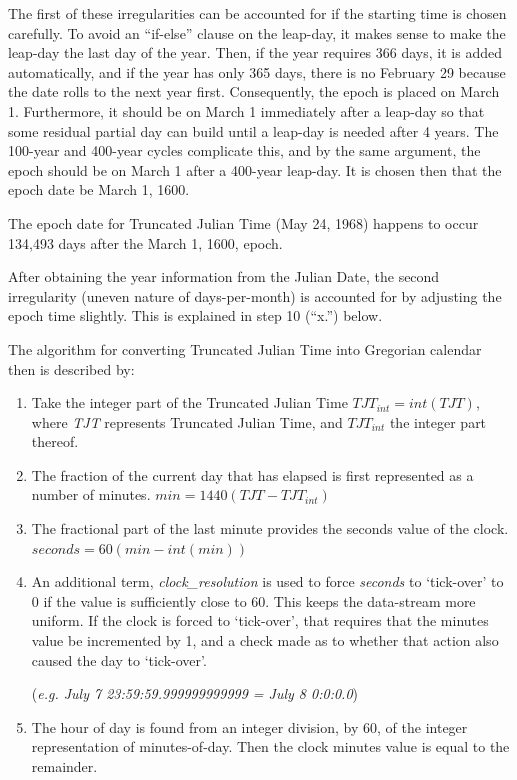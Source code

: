 {\begin{enumerate}
{\begin{enumerate}
The first of these irregularities can be accounted for if the starting
time is chosen carefully.  To avoid an
{\textquotedblleft}if-else{\textquotedblright} clause on the leap-day,
it makes sense to make the leap-day the last day of the year.  Then, if
the year requires 366 days, it is added automatically, and if the year
has only 365 days, there is no February 29 because the date rolls to
the next year first.  Consequently, the epoch is placed on March 1. 
Furthermore, it should be on March 1 immediately after a leap-day so
that some residual partial day can build until a leap-day is needed
after 4 years.  The 100-year and 400-year cycles complicate this, and
by the same argument, the epoch should be on March 1 after a 400-year
leap-day.  It is chosen then that the epoch date be March 1, 1600.

The epoch date for Truncated Julian Time (May 24, 1968) happens to occur
134,493 days after the March 1, 1600, epoch.  

After obtaining the year information from the Julian Date, the second
irregularity (uneven nature of days-per-month) is accounted for by
adjusting the epoch time slightly.  This is explained in step 10 (``x.'') 
below.

The algorithm for converting Truncated Julian Time into Gregorian
calendar then is described by:

\begin{enumerate}
\item Take the integer part of the Truncated Julian Time  
$TJT_{int}=int(TJT)$, where \textit{TJT } represents Truncated Julian Time, and
$TJT_{int}$ the integer part thereof.
\item The fraction of the current day that has elapsed is first
represented as a number of minutes. 
${min}=1440\left({TJT}-{TJT}_{int}\right)$
\item The fractional part of the last minute provides the seconds value
of the clock. 
${seconds}=60\left({min}-int(min)\right)$
\item An additional term, \textit{clock\_resolution }is used to force
\textit{seconds } to `tick-over' to 0
if the value is sufficiently close to 60.  This keeps the data-stream
more uniform.  If the clock is forced to
`tick-over', that requires that the
minutes value be incremented by 1, and a check made as to whether that
action also caused the day to
`tick-over'. 

(\textit{e.g. July 7 23:59:59.999999999999 = July 8 0:0:0.0})
\item The hour of day is found from an integer division, by 60, of the
integer representation of minutes-of-day.  Then the clock minutes value
is equal to the remainder.


\end{enumerate}
\end{enumerate}}
\end{enumerate}}
